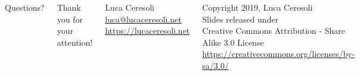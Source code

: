 \documentclass[xetex,table,aspectratio=169]{beamer}
\begin{document}
\begin{frame}
  \begin{columns}
    \center

    {\Huge Questions?}

    \center

    {\Large Thank you for your attention!}

    \vspace{0.15\textheight}

    {\Large Luca Ceresoli}\\
    \href{mailto:luca@lucaceresoli.net}{luca@lucaceresoli.net}\\
    \url{https://lucaceresoli.net}

    \vspace{0.05\textheight}

    \tiny
    \textcopyright{} Copyright 2019, Luca Ceresoli\\
    Slides released under\\
    Creative Commons Attribution - Share Alike 3.0 License \\
    \url{https://creativecommons.org/licenses/by-sa/3.0/} \\
\end{columns}
\end{frame}
\end{document}
